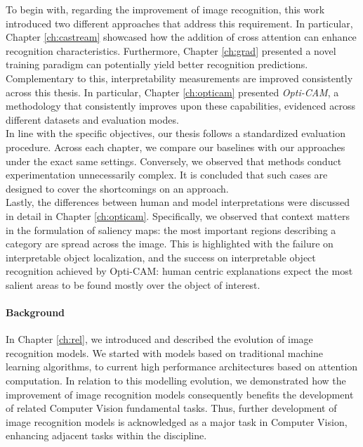 \noindent To begin with, regarding the improvement of image recognition, this work 
introduced two different approaches that address this requirement. In particular, Chapter 
\ref{ch:castream} showcased how the addition of cross attention can enhance 
recognition characteristics. Furthermore, Chapter \ref{ch:grad} presented a novel training paradigm 
can potentially yield better recognition predictions. Complementary to this, 
interpretability measurements are improved consistently across this thesis. In particular, 
Chapter \ref{ch:opticam} presented \emph{Opti-CAM}, a methodology that consistently improves 
upon these capabilities, evidenced across different datasets and evaluation modes.\\

\noindent In line with the specific objectives, our thesis follows a standardized evaluation 
procedure. Across each chapter, we compare our baselines with our approaches under the exact 
same settings. Conversely, we observed that methods conduct experimentation unnecessarily complex. 
It is concluded that such cases are designed to cover the shortcomings on an approach.\\

\noindent Lastly, the differences between human and model interpretations were discussed in 
detail in Chapter \ref{ch:opticam}. Specifically, we observed that context matters in the 
formulation of saliency maps: the most important regions describing a category are spread across 
the image. This is highlighted with the failure on interpretable object localization, and the 
success on interpretable object recognition achieved by Opti-CAM: human centric explanations 
expect the most salient areas to be found mostly over the object of interest. \\

\paragraph{Background}
\label{sub:conc_back}
\noindent In Chapter \ref{ch:rel}, we introduced and described the evolution of image recognition 
models. We started with models based on traditional machine learning algorithms, to current high 
performance architectures based on attention computation. In relation to this modelling evolution, we 
demonstrated how the improvement of image recognition models consequently benefits the development 
of related Computer Vision fundamental tasks. Thus, further development of image recognition models 
is acknowledged as a major task in Computer Vision, enhancing adjacent tasks within the discipline.\\

